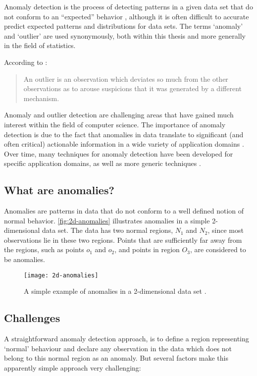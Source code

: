 Anomaly detection is the process of detecting patterns in a given data set that
do not conform to an ``expected'' behavior \cite{Chandola:2007}, although it is
often difficult to accurate predict expected patterns and distributions for data
sets. The terms `anomaly' and `outlier' are used synonymously, both within this
thesis and more generally in the field of statistics.

According to \citeauthor{Hawkins:1980} \cite{Hawkins:1980}:
\begin{quote}
An outlier is an observation which deviates so much from the other observations
as to arouse suspicions that it was generated by a different mechanism.
\end{quote}

Anomaly and outlier detection are challenging areas that have gained much
interest within the field of computer science. The importance of anomaly
detection is due to the fact that anomalies in data translate to significant
(and often critical) actionable information in a wide variety of application
domains \cite{Chandola:2007}. Over time, many techniques for anomaly detection
have been developed for specific application domains, as well as more generic
techniques \cite{Chandola:2007}.

\subsection{What are anomalies?}
\label{anomalyDetection:whatAreAnomalies}
Anomalies are patterns in data that do not conform to a well defined notion of
normal behavior. \autoref{fig:2d-anomalies} illustrates anomalies in a simple
2-dimensional data set. The data has two normal regions, $N_{1}$ and $N_{2}$,
since most observations lie in these two regions. Points that are sufficiently
far away from the regions, such as points $o_{1}$ and $o_{2}$, and points in
region $O_{3}$, are considered to be anomalies.

\begin{figure}
    \centering
    \texttt{[image: 2d-anomalies]}
    \caption[A simple example of anomalies in a 2-dimensional data set.]
        {A simple example of anomalies in a 2-dimensional data set
        \cite{Chandola:2007}.}
    \label{fig:2d-anomalies}
\end{figure}

\subsection{Challenges}
\label{anomalyDetection:Challenges}
A straightforward anomaly detection approach, is to define a region representing
`normal' behaviour and declare any observation in the data which does not belong
to this normal region as an anomaly. But several factors make this apparently
simple approach very challenging:

